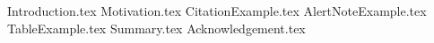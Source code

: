 \documentclass[aspectratio=169]{beamer}
\begin{document}
\maketitlepage %
\maketableofcontents %
\makesubsectionpopup %

{Introduction.tex}
{Motivation.tex}
{CitationExample.tex}
{AlertNoteExample.tex}
{TableExample.tex}
{Summary.tex}
{Acknowledgement.tex}
\end{document}

